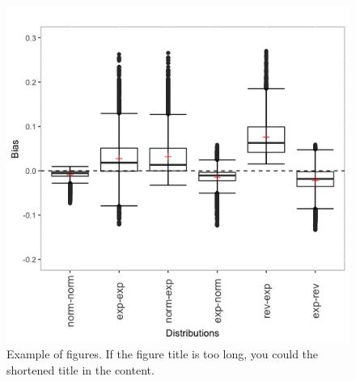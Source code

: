 \documentclass[a4paper, 12pt, twoside]{article}
\begin{document}
\begin{figure}
	\centering
	\includegraphics[width=\linewidth]{fig/bias_boxplot}
	\caption[Example of Figures.]{Example of figures. If the figure title is too long, you could the shortened title in the content. }
	\label{fig:ex1}
\end{figure}

\newpage
\doublespacing
\appendix



\end{document}

